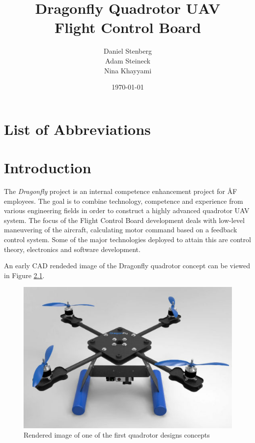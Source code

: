 \documentclass[a4paper]{report}
\title{Dragonfly Quadrotor UAV \\ Flight Control Board}
\author{Daniel Stenberg \\ Adam Steineck \\ Nina Khayyami}
\date{\today}         			%
\begin{document}

\maketitle                      		%

\newpage

\tableofcontents				%

\newpage

\chapter{List of Abbreviations}

\chapter{Introduction}

The \emph{Dragonfly} project is an internal competence enhancement project for ÅF employees. The goal is to combine technology, competence and experience from various engineering fields in order to construct a highly advanced quadrotor UAV system. The focus of the Flight Control Board development deals with low-level maneuvering of the aircraft, calculating motor command based on a feedback control system. Some of the major technologies deployed to attain this are control theory, electronics and software development.

An early CAD rendeded image of the Dragonfly quadrotor concept can be viewed in Figure \ref{fig:quadrendered1}.

\begin{figure}[h]
    \centering
    \includegraphics[scale=0.4]{images/quad_concept1_rendered.jpg}
    \caption{Rendered image of one of the first quadrotor designs concepts}
    \label{fig:quadrendered1}
\end{figure}
\end{document}
